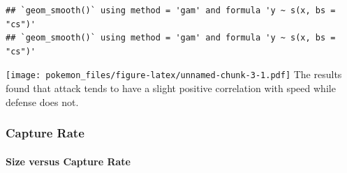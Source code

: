 \documentclass[
]{article}
\newenvironment{Shaded}{\begin{snugshade}}{\end{snugshade}}
\newcommand{\AttributeTok}[1]{\textcolor[rgb]{0.77,0.63,0.00}{#1}}
\newcommand{\CommentTok}[1]{\textcolor[rgb]{0.56,0.35,0.01}{\textit{#1}}}
\newcommand{\DecValTok}[1]{\textcolor[rgb]{0.00,0.00,0.81}{#1}}
\newcommand{\FloatTok}[1]{\textcolor[rgb]{0.00,0.00,0.81}{#1}}
\newcommand{\FunctionTok}[1]{\textcolor[rgb]{0.00,0.00,0.00}{#1}}
\newcommand{\NormalTok}[1]{#1}
\newcommand{\OtherTok}[1]{\textcolor[rgb]{0.56,0.35,0.01}{#1}}
\newcommand{\SpecialCharTok}[1]{\textcolor[rgb]{0.00,0.00,0.00}{#1}}
\newcommand{\StringTok}[1]{\textcolor[rgb]{0.31,0.60,0.02}{#1}}
\begin{document}
\begin{Shaded}
\end{Shaded}

\begin{verbatim}
## `geom_smooth()` using method = 'gam' and formula 'y ~ s(x, bs = "cs")'
## `geom_smooth()` using method = 'gam' and formula 'y ~ s(x, bs = "cs")'
\end{verbatim}

\texttt{[image: pokemon\_files/figure-latex/unnamed-chunk-3-1.pdf]} The
results found that attack tends to have a slight positive correlation
with speed while defense does not.

\hypertarget{capture-rate}{%
\subsubsection{Capture Rate}\label{capture-rate}}

\hypertarget{size-versus-capture-rate}{%
\paragraph{Size versus Capture Rate}\label{size-versus-capture-rate}}
\end{document}
